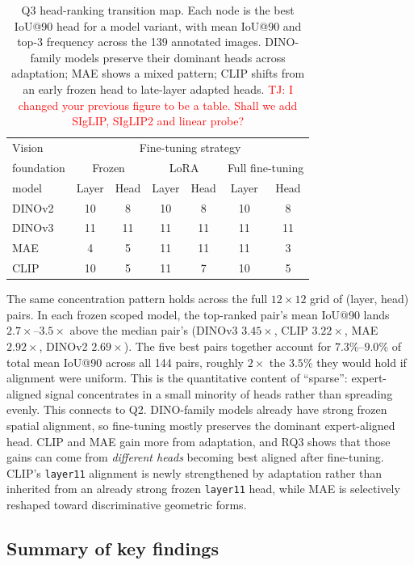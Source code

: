 \documentclass[lineno,pdflatex,sn-mathphys-num]{sn-jnl}%
\theoremstyle{thmstyleone}%
\theoremstyle{thmstyletwo}%
\theoremstyle{thmstylethree}%
\begin{document}
\begin{table}[!h]
\caption{Q3 head-ranking transition map. Each node is the best IoU@90 head for a model variant, with mean IoU@90 and top-3 frequency across the 139 annotated images. DINO-family models preserve their dominant heads across adaptation; MAE shows a mixed pattern; CLIP shifts from an early frozen head to late-layer adapted heads. \textcolor{red}{TJ: I changed your previous figure to be a table. Shall we add SIgLIP, SIgLIP2 and linear probe?}\label{table RQ3 head ranking}}
\begin{tabular}{l|cccccc}
\hline
Vision & \multicolumn{6}{c}{Fine-tuning strategy}  \\
foundation & \multicolumn{2}{c}{Frozen} & \multicolumn{2}{c}{LoRA} & \multicolumn{2}{l}{Full fine-tuning} \\
model & Layer & Head & Layer & Head & Layer & Head \\ \hline
DINOv2 & 10 & 8 & 10 & 8 & 10 & 8 \\
DINOv3 & 11 & 11 & 11 & 11 & 11 & 11 \\
MAE & 4 & 5 & 11 & 11 & 11 & 3 \\
CLIP & 10 & 5 & 11 & 7 & 10 & 5 \\\hline
\end{tabular}
\end{table}

The same concentration pattern holds across the full $12 \times 12$ grid of (layer, head) pairs. In each frozen scoped model, the top-ranked pair's mean IoU@90 lands $2.7\times$--$3.5\times$ above the median pair's (DINOv3 $3.45\times$, CLIP $3.22\times$, MAE $2.92\times$, DINOv2 $2.69\times$). The five best pairs together account for $7.3\%$--$9.0\%$ of total mean IoU@90 across all 144 pairs, roughly $2\times$ the $3.5\%$ they would hold if alignment were uniform. This is the quantitative content of ``sparse'': expert-aligned signal concentrates in a small minority of heads rather than spreading evenly. This connects to Q2. DINO-family models already have strong frozen spatial alignment, so fine-tuning mostly preserves the dominant expert-aligned head. CLIP and MAE gain more from adaptation, and RQ3 shows that those gains can come from \emph{different heads} becoming best aligned after fine-tuning. CLIP's \texttt{layer11} alignment is newly strengthened by adaptation rather than inherited from an already strong frozen \texttt{layer11} head, while MAE is selectively reshaped toward discriminative geometric forms.


\subsection{Summary of key findings}
\end{document}
